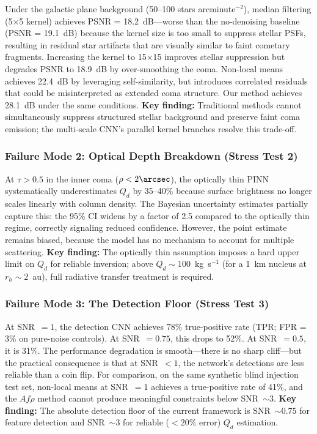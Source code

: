 \documentclass[usenatbib]{mnras}
\begin{document}
Under the galactic plane background (50--100 stars arcminute$^{-2}$), median filtering (5$\times$5 kernel) achieves PSNR = 18.2~dB---worse than the no-denoising baseline (PSNR = 19.1~dB) because the kernel size is too small to suppress stellar PSFs, resulting in residual star artifacts that are visually similar to faint cometary fragments. Increasing the kernel to 15$\times$15 improves stellar suppression but degrades PSNR to 18.9~dB by over-smoothing the coma. Non-local means achieves 22.4~dB by leveraging self-similarity, but introduces correlated residuals that could be misinterpreted as extended coma structure. Our method achieves 28.1~dB under the same conditions. \textbf{Key finding:} Traditional methods cannot simultaneously suppress structured stellar background and preserve faint coma emission; the multi-scale CNN's parallel kernel branches resolve this trade-off.

\subsubsection{Failure Mode 2: Optical Depth Breakdown (Stress Test 2)}

At $\tau > 0.5$ in the inner coma ($\rho < 2\arcsec$), the optically thin PINN systematically underestimates $Q_d$ by 35--40\% because surface brightness no longer scales linearly with column density. The Bayesian uncertainty estimates partially capture this: the 95\% CI widens by a factor of 2.5 compared to the optically thin regime, correctly signaling reduced confidence. However, the point estimate remains biased, because the model has no mechanism to account for multiple scattering. \textbf{Key finding:} The optically thin assumption imposes a hard upper limit on $Q_d$ for reliable inversion; above $Q_d \sim 100$~kg~s$^{-1}$ (for a 1~km nucleus at $r_h \sim 2$~au), full radiative transfer treatment is required.

\subsubsection{Failure Mode 3: The Detection Floor (Stress Test 3)}

At SNR~$=1$, the detection CNN achieves 78\% true-positive rate (TPR; FPR = 3\% on pure-noise controls). At SNR~$=0.75$, this drops to 52\%. At SNR~$=0.5$, it is 31\%. The performance degradation is smooth---there is no sharp cliff---but the practical consequence is that at SNR~$<1$, the network's detections are less reliable than a coin flip. For comparison, on the same synthetic blind injection test set, non-local means at SNR~$=1$ achieves a true-positive rate of 41\%, and the $Af\rho$ method cannot produce meaningful constraints below SNR~$\sim 3$. \textbf{Key finding:} The absolute detection floor of the current framework is SNR~$\sim 0.75$ for feature detection and SNR~$\sim 3$ for reliable ($<20\%$ error) $Q_d$ estimation.
\end{document}

